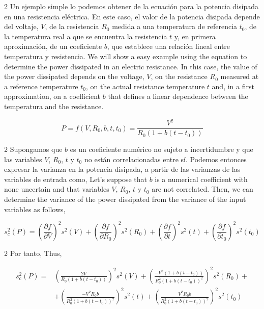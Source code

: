 \begin{paracol}{2}
Un ejemplo simple lo podemos obtener de la ecuación para la potencia disipada en una resistencia eléctrica. En este caso, el valor de la potencia disipada depende del voltaje, $V$, de la resistencia $R_0$ medida a una temperatura de referencia $t_0$, de la temperatura real a que se encuentra la resistencia $t$ y, en primera aproximación, de un coeficiente $b$, que establece una relación lineal entre temperatura y resistencia.
\switchcolumn
We will show a easy example using the equation to determine the power dissipated in an electric resistance. In this case, the value of the power dissipated depends on the voltage, $V$, on the resistance $R_0$ measured at a reference temperature $t_0$, on the actual resistance temperature $t$ and, in a first approximation, on a coefficient $b$ that defines a linear dependence between the temperatura and the resistance.    
\end{paracol}
\begin{equation*}
P = f(V,R_0,b,t,t_0) = \frac{V^2}{R_0\left(1+b(t-t_0)\right)}
\end{equation*}
\begin{paracol}{2}
Supongamos que $b$ es un coeficiente numérico no sujeto a incertidumbre y que las  variables $V$, $R_0$, $t$ y $t_0$ no están correlacionadas entre sí. Podemos entonces expresar la varianza  en la  potencia disipada, a partir de las varianzas de las variables de entrada como,
\switchcolumn
Let's suppose that $b$ is a numerical coefficient with none uncertain and that variables $V$, $R_0$, $t$ y $t_0$ are not correlated. Then, we can determine the variance of the power dissipated from the variance of the input variables as follows,
\end{paracol}
\begin{equation*}
s_c^2(P) = \left(\frac{\partial f}{\partial V}\right)^2 s^2(V)+ \left(\frac{\partial f}{\partial R_0}\right)^2 s^2(R_0)+ \left(\frac{\partial f}{\partial t}\right)^2 s^2(t)+\left(\frac{\partial f}{\partial t_0}\right)^2 s^2(t_0)    
\end{equation*}
\begin{paracol}{2}
Por tanto,
\switchcolumn
Thus,
\end{paracol}
\begin{align*}
s_c^2(P) =& \left(\frac{2V}{R_0\left(1+b(t-t_0)\right)}\right)^2 s^2(V)+ \left(\frac{-V^2\left(1+b(t-t_0)\right)}{R_0^2\left(1+b(t-t_0)\right)^2}\right)^2 s^2(R_0)+\\
&+ \left(\frac{-V^2R_0b}{R_0^2\left(1+b(t-t_0)\right)^2}\right)^2 s^2(t)+\left(\frac{V^2R_0b}{R_0^2\left(1+b(t-t_0)\right)^2}\right)^2 s^2(t_0)    
\end{align*}
